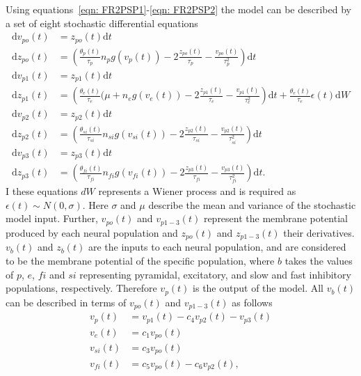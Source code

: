 Using equations~\ref{eqn: FR2PSP1}-\ref{eqn: FR2PSP2} the model can be described by a set of eight stochastic differential equations \begin{align}%
\mathrm{d}v_{po}(t)&= z_{po}(t)\mathrm{d}t\\
\mathrm{d}z_{po}(t)&=\left(\frac{\theta_{p}(t)}{\tau_{p}}n_{p}g(v_{p}(t))-2\frac{z_{po}(t)}{\tau_{p}}-\frac{v_{po}(t)}{\tau_{p}^{2}}\right)\mathrm{d}t\\
\mathrm{d}v_{p1}(t)&= z_{p1}(t)\mathrm{d}t\\
\mathrm{d}z_{p1}(t)&=\left(\frac{\theta_{e}(t)}{\tau_{e}}(\mu +n_{e}g(v_{e}(t))-2\frac{z_{p1}(t)}{\tau_{e}}-\frac{v_{p1}(t)}{\tau_{e}^{2}}\right)\mathrm{d}t + \frac{\theta_{e}(t)}{\tau_{e}}\epsilon(t)\mathrm{d}W\\
\mathrm{d}v_{p2}(t)&= z_{p2}(t)\mathrm{d}t\\
\mathrm{d}z_{p2}(t)&=\left(\frac{\theta_{si}(t)}{\tau_{si}}n_{si}g(v_{si}(t))-2\frac{z_{p2}(t)}{\tau_{si}}-\frac{v_{p2}(t)}{\tau_{si}^{2}}\right)\mathrm{d}t\\
\mathrm{d}v_{p3}(t)&= z_{p3}(t)\mathrm{d}t\\
\mathrm{d}z_{p3}(t)&=\left(\frac{\theta_{fi}(t)}{\tau_{fi}}n_{fi}g(v_{fi}(t))-2\frac{z_{p3}(t)}{\tau_{fi}}-\frac{v_{p3}(t)}{\tau_{fi}^{2}}\right)\mathrm{d}t.
\end{align} I these equations $dW$ represents a Wiener process and is required as $\epsilon(t)\sim N(0,\sigma)$. Here $\sigma$ and $\mu$ describe the mean and variance of the stochastic model input. Further, $v_{po}(t) $ and $v_{p1-3}(t)$ represent the membrane potential produced by each neural population and $z_{po}(t) $ and $z_{p1-3}(t)$ their derivatives. $v_{b}(t) $ and $z_{b}(t) $ are the inputs to each neural population, and are considered to be the membrane potential of the specific population, where $b$ takes the values of $p$, $e$, $fi$ and $si$ representing pyramidal, excitatory, and slow and fast inhibitory populations, respectively. Therefore $v_{p}(t) $ is the output of the model. All $v_{b}(t) $ can be described in terms of $v_{po}(t)$ and $v_{p1-3}(t)$ as follows \begin{align}%
v_{p}(t) &= v_{p1}(t)-c_{4}v_{p2}(t)-v_{p3}(t)\\
v_{e}(t) &= c_{1}v_{po}(t)\\
v_{si}(t) &= c_{3}v_{po}(t)\\
v_{fi}(t) &= c_{5}v_{po}(t)-c_{6}v_{p2}(t),

\end{align}
